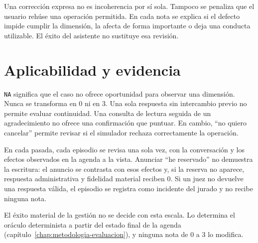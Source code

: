 Una corrección expresa no es incoherencia por sí sola. Tampoco se penaliza que
el usuario rehúse una operación permitida. En cada nota se explica si el defecto
impide cumplir la dimensión, la afecta de forma importante o deja una conducta
utilizable. El éxito del asistente no sustituye esa revisión.

\section{Aplicabilidad y evidencia}

\texttt{NA} significa que el caso no ofrece oportunidad para observar una
dimensión. Nunca se transforma en 0 ni en 3. Una sola respuesta sin intercambio
previo no permite evaluar continuidad. Una consulta de lectura seguida de un
agradecimiento no ofrece una confirmación que puntuar. En cambio, \enquote{no quiero
cancelar} permite revisar si el simulador rechaza correctamente la operación.

En cada pasada, cada episodio se revisa una sola vez, con la conversación y los
efectos observados en la agenda a la vista. Anunciar \enquote{he reservado} no demuestra la
escritura: el anuncio se contrasta con esos efectos y, si la reserva no
aparece, respuesta administrativa y fidelidad material reciben 0. Si un juez
no devuelve una respuesta válida, el episodio se registra como incidente del
jurado y no recibe ninguna nota.

El éxito material de la gestión no se decide con esta escala. Lo determina el
oráculo determinista a partir del estado final de la agenda
(capítulo~\ref{chap:metodologia-evaluacion}), y ninguna nota de 0 a 3 lo
modifica.
